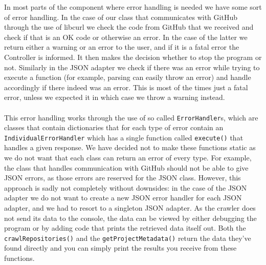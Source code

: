 \documentclass[../Main.tex]{subfiles}
\begin{document}
In most parts of the component where error handling is needed we have some sort of error handling. In the case of our class that communicates with GitHub through the use of libcurl we check the code from GitHub that we received and check if that is an OK code or otherwise an error. In the case of the latter we return either a warning or an error to the user, and if it is a fatal error the Controller is informed. It then makes the decision whether to stop the program or not. Similarly in the JSON adapter we check if there was an error while trying to execute a function (for example, parsing can easily throw an error) and handle accordingly if there indeed was an error. This is most of the times just a fatal error, unless we expected it in which case we throw a warning instead. \\
\\
This error handling works through the use of so called \texttt{ErrorHandler}s, which are classes that contain dictionaries that for each type of error contain an \texttt{IndividualErrorHandler} which has a single function called \texttt{execute()} that handles a given response. We have decided not to make these functions static as we do not want that each class can return an error of every type. For example, the class that handles communication with GitHub should not be able to give JSON errors, as those errors are reserved for the JSON class. However, this approach is sadly not completely without downsides: in the case of the JSON adapter we do not want to create a new JSON error handler for each JSON adapter, and we had to resort to a singleton JSON adapter.
As the crawler does not send its data to the console, the data can be viewed by either debugging the program or by adding code that prints the retrieved data itself out. Both the \texttt{crawlRepositories()} and the \texttt{getProjectMetadata()} return the data they've found directly and you can simply print the results you receive from these functions.
\end{document}
